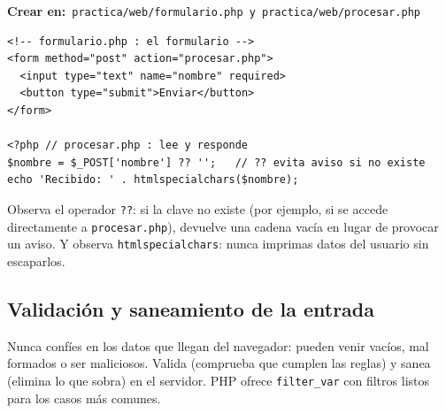 \documentclass[11pt]{article}
\begin{document}
{\small\color{phpazulo}\textbf{Crear en:}~}\texttt{practica/\allowbreak{}web/\allowbreak{}formulario.\allowbreak{}php  y  practica/\allowbreak{}web/\allowbreak{}procesar.\allowbreak{}php}\par\nobreak\vspace{-1pt}
\begin{cajacodigo}
\begin{lstlisting}[style=php]
<!-- formulario.php : el formulario -->
<form method="post" action="procesar.php">
  <input type="text" name="nombre" required>
  <button type="submit">Enviar</button>
</form>

<?php // procesar.php : lee y responde
$nombre = $_POST['nombre'] ?? '';   // ?? evita aviso si no existe
echo 'Recibido: ' . htmlspecialchars($nombre);
\end{lstlisting}
\end{cajacodigo}
\vspace{2pt}
Observa el operador \texttt{?\allowbreak{}?\allowbreak{}}: si la clave no existe (por ejemplo, si se accede directamente a \texttt{procesar.\allowbreak{}php}), devuelve una cadena vacía en lugar de provocar un aviso. Y observa \texttt{htmlspecialchars}: nunca imprimas datos del usuario sin escaparlos.

\subsection{Validación y saneamiento de la entrada}
Nunca confíes en los datos que llegan del navegador: pueden venir vacíos, mal formados o ser maliciosos. Valida (comprueba que cumplen las reglas) y sanea (elimina lo que sobra) en el servidor. PHP ofrece \texttt{filter\_var} con filtros listos para los casos más comunes.
\end{document}
